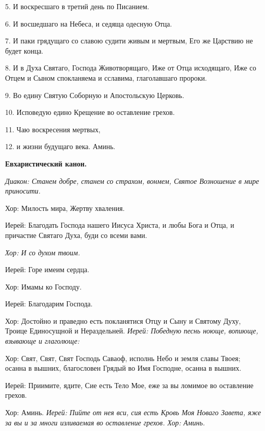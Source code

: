   5. И воскресшаго в третий день по Писанием.


  6. И восшедшаго на Небеса, и седяща одесную Отца.


  7. И паки грядущаго со славою судити живым и мертвым, Его же Царствию не будет конца.


  8. И в Духа Святаго, Господа Животворящаго, Иже от Отца исходящаго, Иже со Отцем и Сыном спокланяема и сславима, глаголавшаго пророки.


  9. Во едину Святую Соборную и Апостольскую Церковь.


  10. Исповедую едино Крещение во оставление грехов.


  11. Чаю воскресения мертвых,


  12. и жизни будущаго века. Аминь. 


\medskip


\bfseries  Евхаристический канон. \normalfont{}\nopagebreak


\itshape  Диакон:\normalfont{} Станем добре, станем со страхом, вонмем, Святое Возношение в мире приносити\itshape . 


  Хор:\normalfont{} Милость мира, Жертву хваления. \itshape 


  Иерей:\normalfont{} Благодать Господа нашего Иисуса Христа, и любы Бога и Отца, и причастие Святаго Духа, буди со всеми вами.


\itshape Хор:\normalfont{} И со духом твоим. \itshape 


  Иерей:\normalfont{} Горе имеим сердца. \itshape 


  Хор:\normalfont{} Имамы ко Господу. \itshape 


  Иерей:\normalfont{} Благодарим Господа. \itshape 


  Хор:\normalfont{} Достойно и праведно есть покланятися Отцу и Сыну и Святому Духу, Троице Единосущной и Нераздельней. \itshape  Иерей:\normalfont{} Победную песнь ноюще, вопиюще, взывающе и глаголюще: \itshape 


  Хор:\normalfont{} Свят, Свят, Свят Господь Саваоф, исполнь Небо и земля славы Твоея; осанна в вышних, благословен Грядый во Имя Господне, осанна в вышних. \itshape 


  Иерей:\normalfont{} Приимите, ядите, Сие есть Тело Мое, еже за вы ломимое во оставление грехов. \itshape 


  Хор:\normalfont{} Аминь. \itshape  Иерей:\normalfont{} Пийте от нея вси, сия есть Кровь Моя Новаго Завета, яже за вы и за многи изливаемая во оставление грехов. \itshape  Хор:\normalfont{} Аминь. 


